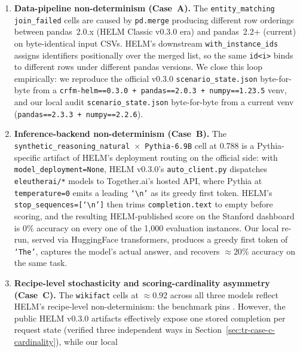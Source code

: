 \documentclass[11pt]{article}
\begin{document}
\begin{enumerate}
  \item \textbf{Data-pipeline non-determinism (Case~A).}
        The \texttt{entity\_matching} \texttt{join\_failed} cells are
        caused by \texttt{pd.merge} producing different row orderings
        between pandas~2.0.x (HELM Classic v0.3.0 era) and pandas~2.2+
        (current) on byte-identical input CSVs.
        HELM's downstream \texttt{with\_instance\_ids} assigns
        identifiers positionally over the merged list, so the same
        \texttt{id<i>} binds to different rows under different pandas
        versions.
        We close this loop empirically: we reproduce the official
        v0.3.0 \texttt{scenario\_state.json} byte-for-byte from a
        \texttt{crfm-helm==0.3.0 + pandas==2.0.3 + numpy==1.23.5} venv,
        and our local audit \texttt{scenario\_state.json} byte-for-byte
        from a current venv (\texttt{pandas==2.3.3 + numpy==2.2.6}).
  \item \textbf{Inference-backend non-determinism (Case~B).}
        The \texttt{synthetic\_reasoning\_natural~$\times$~Pythia-6.9B}
        cell at $0.788$ is a Pythia-specific artifact of HELM's
        deployment routing on the official side: with
        \texttt{model\_deployment=None}, HELM v0.3.0's
        \texttt{auto\_client.py} dispatches \texttt{eleutherai/*}
        models to Together.ai's hosted API, where Pythia at
        \texttt{temperature=0} emits a leading
        \texttt{`\textbackslash n'} as its greedy first token.
        HELM's \texttt{stop\_sequences=[`\textbackslash n']} then
        trims \texttt{completion.text} to empty before scoring, and
        the resulting HELM-published score on the Stanford dashboard
        is $0\%$ accuracy on every one of the 1{,}000 evaluation
        instances.
        Our local re-run, served via HuggingFace transformers,
        produces a greedy first token of \texttt{`The'}, captures the
        model's actual answer, and recovers $\approx 20\%$ accuracy on
        the same task.
  \item \textbf{Recipe-level stochasticity and scoring-cardinality asymmetry (Case~C).}
        The \texttt{wikifact} cells at $\approx 0.92$ across all three
        models reflect HELM's recipe-level non-determinism: the
        benchmark pins .  However,
        the public HELM v0.3.0 artifacts effectively expose one stored
        completion per request state (verified three independent ways
        in Section~\ref{sec:tr-case-c-cardinality}), while our local

\end{enumerate}
\end{document}
